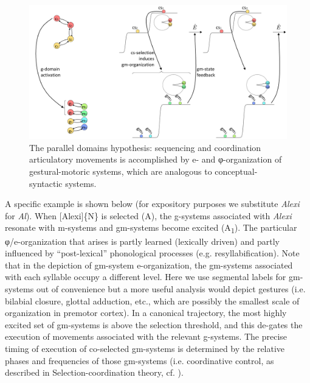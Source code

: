   
\begin{figure}
\includegraphics[width=\textwidth]{figures/Tilsen-img54.png}
\caption{The parallel domains hypothesis: sequencing and coordination articulatory movements is accomplished by e- and φ-organization of gestural-motoric systems, which are analogous to conceptual-syntactic systems.}
\label{fig:4:4}
\end{figure}
 

  A specific example is shown below (for expository purposes we substitute \textit{Alexi} for \textit{Al}). When [Alexi]\{N\} is selected (A), the g-systems associated with \textit{Alexi} resonate with m-systems and gm-systems become excited (A\textsubscript{1}). The particular φ/e-organization that arises is partly learned (lexically driven) and partly influenced by “post-lexical” phonological processes (e.g. resyllabification). Note that in the depiction of gm-system e-organization, the gm-systems associated with each syllable occupy a different level. Here we use segmental labels for gm-systems out of convenience but a more useful analysis would depict gestures (i.e. bilabial closure, glottal adduction, etc., which are possibly the smallest scale of organization in premotor cortex). In a canonical trajectory, the most highly excited set of gm-systems is above the selection threshold, and this de-gates the execution of movements associated with the relevant g-systems. The precise timing of execution of co-selected gm-systems is determined by the relative phases and frequencies of those gm-systems (i.e. coordinative control, as described in Selection-coordination theory, cf. \citealt{Tilsen2016,Tilsen2018}). 

